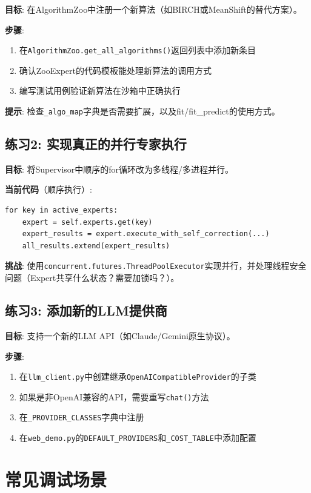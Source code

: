 \documentclass[11pt,a4paper]{ctexbook}
\begin{document}
\textbf{目标}: 在AlgorithmZoo中注册一个新算法（如BIRCH或MeanShift的替代方案）。

\textbf{步骤}:
\begin{enumerate}
    \item 在\verb|AlgorithmZoo.get_all_algorithms()|返回列表中添加新条目
    \item 确认ZooExpert的代码模板能处理新算法的调用方式
    \item 编写测试用例验证新算法在沙箱中正确执行
\end{enumerate}

\textbf{提示}: 检查\verb|_algo_map|字典是否需要扩展，以及fit/fit\_predict的使用方式。

\subsection{练习2: 实现真正的并行专家执行}

\textbf{目标}: 将Supervisor中顺序的for循环改为多线程/多进程并行。

\textbf{当前代码}（顺序执行）:
\begin{verbatim}
for key in active_experts:
    expert = self.experts.get(key)
    expert_results = expert.execute_with_self_correction(...)
    all_results.extend(expert_results)
\end{verbatim}

\textbf{挑战}: 使用\verb|concurrent.futures.ThreadPoolExecutor|实现并行，并处理线程安全问题（Expert共享什么状态？需要加锁吗？）。

\subsection{练习3: 添加新的LLM提供商}

\textbf{目标}: 支持一个新的LLM API（如Claude/Gemini原生协议）。

\textbf{步骤}:
\begin{enumerate}
    \item 在\verb|llm_client.py|中创建继承\verb|OpenAICompatibleProvider|的子类
    \item 如果是非OpenAI兼容的API，需要重写\verb|chat()|方法
    \item 在\verb|_PROVIDER_CLASSES|字典中注册
    \item 在\verb|web_demo.py|的\verb|DEFAULT_PROVIDERS|和\verb|_COST_TABLE|中添加配置
\end{enumerate}

\section{常见调试场景}
\end{document}
